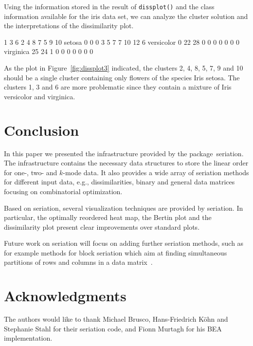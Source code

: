 \documentclass[fleqn, a4paper]{article}
\newcommand{\strong}[1]{{\normalfont\fontseries{b}\selectfont #1}}
\newcommand{\func}[1]{\mbox{\texttt{#1()}}}
\newcommand{\pkg}[1]{\strong{#1}}
\begin{document}
Using the information stored in the result of \func{dissplot} and
the class information available for the iris data set, we can analyze
the cluster solution and the interpretations of the dissimilarity plot.

\begin{Schunk}
\begin{Soutput}
              1  3  6 2 4 8 7  5  9 10
  setosa      0  0  0 3 5 7 7 10 12  6
  versicolor  0 22 28 0 0 0 0  0  0  0
  virginica  25 24  1 0 0 0 0  0  0  0
\end{Soutput}
\end{Schunk}

As the plot in Figure~\ref{fig:dissplot3} indicated, the clusters 2, 4, 8, 5,
7, 9 and 10 should be a single cluster containing only flowers of the species
Iris setosa. The clusters 1, 3 and 6 are more problematic since they contain a
mixture of Iris versicolor and virginica.

\section{Conclusion}
\label{sec:conclusion}

In this paper we presented the infrastructure provided by the
package~\pkg{seriation}. The infrastructure contains the necessary data
structures to store the linear order for one-, two- and $k$-mode data.  It also
provides a wide array of seriation methods for different input data, e.g.,
dissimilarities, binary and general data matrices focusing on combinatorial
optimization.

Based on seriation, several visualization techniques are provided by
\pkg{seriation}.  In particular, the optimally reordered heat map, the
Bertin plot and the dissimilarity plot present clear improvements over
standard plots.

Future work on \pkg{seriation} will focus on adding further seriation
methods, such as for example methods for block seriation which aim at
finding simultaneous partitions of rows and columns in a data
matrix~\citep[see, e.g.,][]{seriation:Marcotorchino:1987}.


\section*{Acknowledgments}
The authors would like to thank Michael Brusco, Hans-Friedrich K{\"o}hn and
Stephanie Stahl for their seriation code, and Fionn Murtagh for his BEA
implementation.  

%
{\small


}
%
\end{document}
